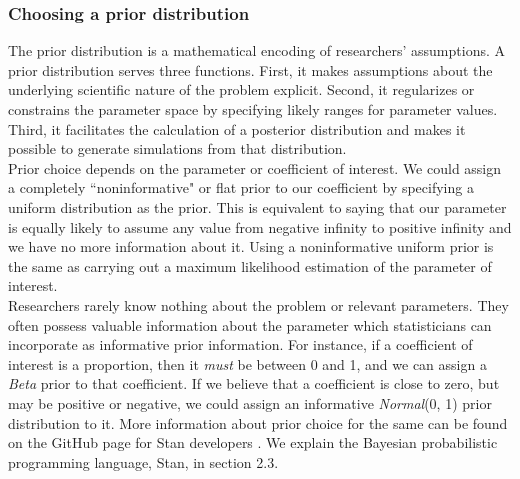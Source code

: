 \documentclass{article}
\begin{document}
\subsubsection{Choosing a prior distribution}
The prior distribution is a mathematical encoding of researchers' assumptions. A prior distribution serves three functions. First, it makes assumptions about the underlying scientific nature of the problem explicit. Second, it regularizes or constrains the parameter space by specifying likely ranges for parameter values. Third, it facilitates the calculation of a posterior distribution and makes it possible to generate simulations from that distribution. \\
Prior choice depends on the parameter or coefficient of interest.  We could assign a completely ``noninformative" or flat prior to our coefficient by specifying a uniform distribution as the prior. This is equivalent to saying that our parameter is equally likely to assume any value from negative infinity to positive infinity and we have no more information about it. Using a noninformative uniform prior is the same as carrying out a maximum likelihood estimation of the parameter of interest. \\
Researchers rarely know nothing about the problem or relevant parameters. They often possess valuable information about the parameter which statisticians can incorporate as informative prior information. For instance, if a coefficient of interest is a proportion, then it \emph{must} be between 0 and 1, and we can assign a \emph{Beta} prior to that coefficient.  If we believe that a coefficient is close to zero, but may be positive or negative, we could assign an informative \emph{Normal}(0, 1) prior distribution to it.  More information about prior choice for the same can be found on the GitHub page for Stan developers \cite{prior-choice}. We explain the Bayesian probabilistic programming language, Stan, in section 2.3.\\
\end{document}
